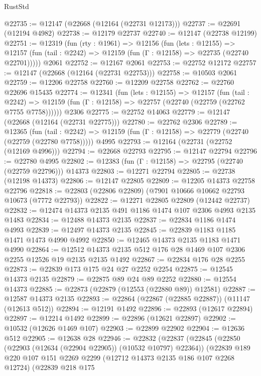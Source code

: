 \begin{lexlean}{RustStd}
\begin{coremodule}
@22735 := @12147 (@22668 (@12164 (@22731 @12173)))
@22737 := @22691 (@12194 @4982)
@22738 := @12179 @22737
@22740 := @12147 (@22738 @12199)
@22751 := @12319
    (fun (rty : @1961) =>
    @12156
      (fun (lets : @12155) =>
      @12157 (fun (tail : @2242) => @12159 (fun (Γ : @12158) => @22735 (@22740 @22701)))))
    @2061
@22752 := @12167 @2061
@22753 := @22752 @12172
@22757 := @12147 (@22668 (@12164 (@22731 @22753)))
@22758 := @10503 @2061
@22759 := @12206 @22758
@22760 := @12209 @22758
@22762 := @22760 @22696 @15435
@22774 := @12341
    (fun (lets : @12155) =>
    @12157
      (fun (tail : @2242) =>
      @12159 (fun (Γ : @12158) => @22757 (@22740 (@22759 (@22762 @7755 @7758))))))
    @2306
@22775 := @22752 @14063
@22779 := @12147 (@22668 (@12164 (@22731 @22775)))
@22780 := @22762 @2306
@22789 := @12365
    (fun (tail : @2242) => @12159 (fun (Γ : @12158) => @22779 (@22740 (@22759 (@22780 @7758)))))
    @4995
@22793 := @12164 (@22731 (@22752 (@12169 @4996)))
@22794 := @22668 @22793
@22795 := @12147 @22794
@22796 := @22780 @4995
@22802 := @12383 (fun (Γ : @12158) => @22795 (@22740 (@22759 @22796))) @14373
@22803 := @12271 @22794
@22805 := @22738 (@12198 @14373)
@22806 := @12147 @22805
@22809 := @12205 @14373 @22758 @22796
@22818 := @22803 (@22806 @22809) (@7901 @10666 @10662 @22793 @10673 (@7772 @22793))
@22822 := @12271 @22805 @22809 (@12442 @22737)
@22832 := @12474 @14373 @2135 @491 @1186 @1474 @107 @2306 @4993 @2135 @1483
@22834 := @12488 @14373 @2135
@22837 := @22834 @1186 @1474 @4993
@22839 := @12497 @14373 @2135
@22845 := @22839 @1183 @1185 @1471 @1473 @4990 @4992
@22850 := @12465 @14373 @2135 @1183 @1471 @4990
@22864 := @12512 @14373 @2135 @512 @176 @28 @1469 @107 @2306 @2255 @12526 @19 @2135 @2135 @1492
@22867 := @22834 @176 @28 @2255
@22873 := @22839 @173 @175 @24 @27 @2252 @2254
@22875 := @12545 @14373 @2135
@22879 := @22875 @89 @24 @89 @2252
@22880 := @12554 @14373
@22885 := @22873 (@22879 (@12553 (@22880 @89)) @12581)
@22887 := @12587 @14373 @2135
@22893 := @22864 (@22867 (@22885 @22887)) (@11147 (@12613 @512))
@22894 := @12191 @1492
@22896 := @22893 (@12617 @22894)
@22897 := @12214 @1492
@22899 := @22896 (@12621 @22897)
@22902 := @10532 (@12626 @1469 @107)
@22903 := @22899 @22902
@22904 := @12636 @512
@22905 := @12638 @28
@22946 := @22832
    (@22837
      (@22845
        (@22850 (@22903 (@12634 (@22904 @22905)) (@10532 @10797) @22364))
        (@22839
          @189
          @220
          @107
          @151
          @2269
          @2299
          (@12712 @14373 @2135 @186 @107 @2268 @12724)
          (@22839
            @218
            @175

\end{coremodule}
\end{lexlean}
